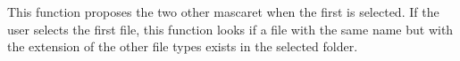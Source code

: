 \documentclass[letterpaper,10pt,english]{sphinxmanual}
\begin{document}
\begin{fulllineitems}
\begin{fulllineitems}
\end{fulllineitems}


\begin{fulllineitems}
\label{\detokenize{index:src_GUI.hydro_GUI_2.Mascaret.propose_next_file}}
This function proposes the two other mascaret when the first is selected. If the user selects the first file,
this function looks if a file with the same name but with the extension of the other file types exists in the
selected folder.

\end{fulllineitems}


\end{fulllineitems}

\end{document}
